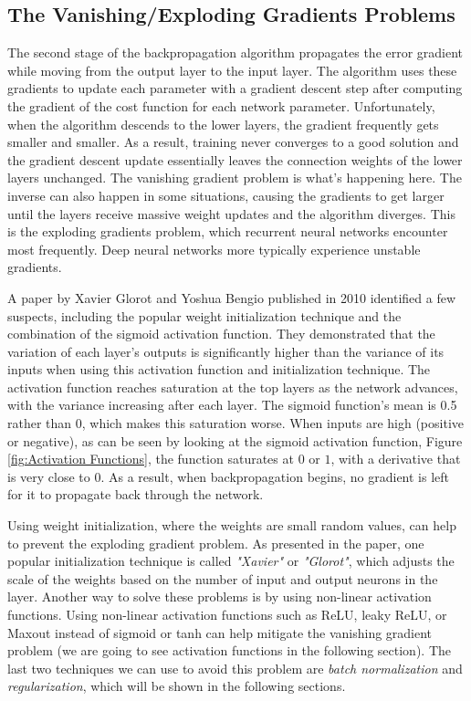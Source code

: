 \subsection{The Vanishing/Exploding Gradients Problems}
The second stage of the backpropagation algorithm propagates the error gradient while moving from the output layer to the input layer. The algorithm uses these gradients to update each parameter with a gradient descent step after computing the gradient of the cost function for each network parameter. 
Unfortunately, when the algorithm descends to the lower layers, the gradient frequently gets smaller and smaller. As a result, training never converges to a good solution and the gradient descent update essentially leaves the connection weights of the lower layers unchanged. The vanishing gradient problem is what's happening here.
The inverse can also happen in some situations, causing the gradients to get larger until the layers receive massive weight updates and the algorithm diverges. This is the exploding gradients problem, which recurrent neural networks encounter most frequently. Deep neural networks more typically experience unstable gradients.

A paper \parencite{glorot2010understanding} by Xavier Glorot and Yoshua Bengio published in 2010 identified a few suspects, including the popular weight initialization technique and the combination of the sigmoid activation function. They demonstrated that the variation of each layer's outputs is significantly higher than the variance of its inputs when using this activation function and initialization technique. The activation function reaches saturation at the top layers as the network advances, with the variance increasing after each layer. The sigmoid function's mean is 0.5 rather than 0, which makes this saturation worse.
When inputs are high (positive or negative), as can be seen by looking at the sigmoid activation function, Figure \ref{fig:Activation Functions}, the function saturates at $0$ or $1$, with a derivative that is very close to $0$. As a result, when backpropagation begins, no gradient is left for it to propagate back through the network. 

Using weight initialization, where the weights are small random values, can help to prevent the exploding gradient problem. As presented in the paper, one popular initialization technique is called \textit{"Xavier"} or \textit{"Glorot"}, which adjusts the scale of the weights based on the number of input and output neurons in the layer. Another way to solve these problems is by using non-linear activation functions. Using non-linear activation functions such as ReLU, leaky ReLU, or Maxout instead of sigmoid or tanh can help mitigate the vanishing gradient problem (we are going to see activation functions in the following section).
The last two techniques we can use to avoid this problem are \textit{batch normalization} and \textit{regularization}, which will be shown in the following sections.